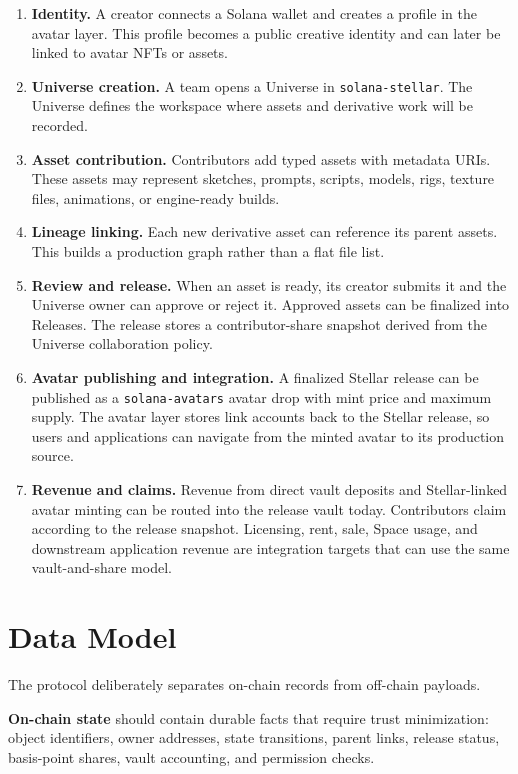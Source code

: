 \documentclass[10pt,twocolumn]{article}
\newcommand{\protocol}[1]{\texttt{#1}}
\begin{document}
\begin{enumerate}
    \item \textbf{Identity.} A creator connects a Solana wallet and creates a profile in the avatar layer. This profile becomes a public creative identity and can later be linked to avatar NFTs or assets.
    \item \textbf{Universe creation.} A team opens a Universe in \protocol{solana-stellar}. The Universe defines the workspace where assets and derivative work will be recorded.
    \item \textbf{Asset contribution.} Contributors add typed assets with metadata URIs. These assets may represent sketches, prompts, scripts, models, rigs, texture files, animations, or engine-ready builds.
    \item \textbf{Lineage linking.} Each new derivative asset can reference its parent assets. This builds a production graph rather than a flat file list.
    \item \textbf{Review and release.} When an asset is ready, its creator submits it and the Universe owner can approve or reject it. Approved assets can be finalized into Releases. The release stores a contributor-share snapshot derived from the Universe collaboration policy.
    \item \textbf{Avatar publishing and integration.} A finalized Stellar release can be published as a \protocol{solana-avatars} avatar drop with mint price and maximum supply. The avatar layer stores link accounts back to the Stellar release, so users and applications can navigate from the minted avatar to its production source.
    \item \textbf{Revenue and claims.} Revenue from direct vault deposits and Stellar-linked avatar minting can be routed into the release vault today. Contributors claim according to the release snapshot. Licensing, rent, sale, Space usage, and downstream application revenue are integration targets that can use the same vault-and-share model.
\end{enumerate}

\section{Data Model}
The protocol deliberately separates on-chain records from off-chain payloads.

\textbf{On-chain state} should contain durable facts that require trust minimization: object identifiers, owner addresses, state transitions, parent links, release status, basis-point shares, vault accounting, and permission checks.
\end{document}

